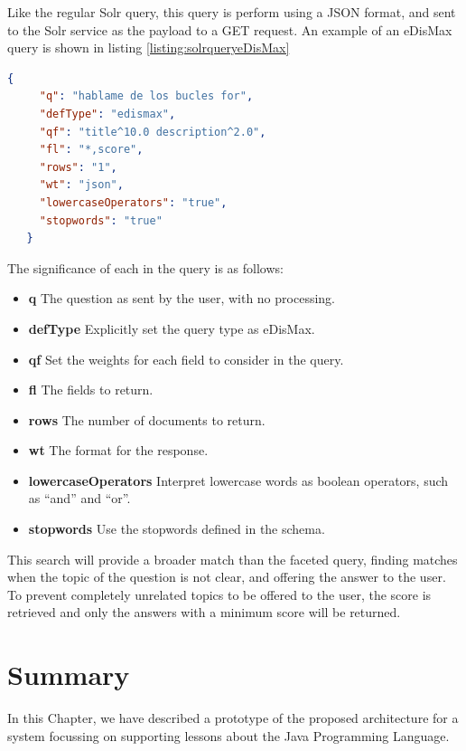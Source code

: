 Like the regular Solr query, this query is perform using a JSON format, and sent to the Solr service as the payload to a GET request. An example of an \ac{eDisMax} query is shown in listing \ref{listing:solrqueryeDisMax}

\begin{center} 
  \begin{lstlisting}[language=json, caption=Example \ac{eDisMax} query for Solr, label=listing:solrqueryeDisMax]
   {
     "q": "hablame de los bucles for",
     "defType": "edismax",
     "qf": "title^10.0 description^2.0",
     "fl": "*,score",
     "rows": "1",
     "wt": "json",
     "lowercaseOperators": "true",
     "stopwords": "true"
   }  
  \end{lstlisting}
\end{center}

The significance of each in the query is as follows:

\begin{itemize}
 \item \textbf{q} The question as sent by the user, with no processing.
 \item \textbf{defType} Explicitly set the query type as \ac{eDisMax}.
 \item \textbf{qf} Set the weights for each field to consider in the query.
 \item \textbf{fl} The fields to return.
 \item \textbf{rows} The number of documents to return.
 \item \textbf{wt} The format for the response.
 \item \textbf{lowercaseOperators} Interpret lowercase words as boolean operators, such as ``and'' and ``or''.
 \item \textbf{stopwords} Use the stopwords defined in the schema.
\end{itemize}

This search will provide a broader match than the faceted query, finding matches when the topic of the question is not clear, and offering the answer to the user. To prevent completely unrelated topics to be offered to the user, the score is retrieved and only the answers with a minimum score will be returned.

\section{Summary}

In this Chapter, we have described a prototype of the proposed architecture for a system focussing on supporting lessons about the Java Programming Language. 

